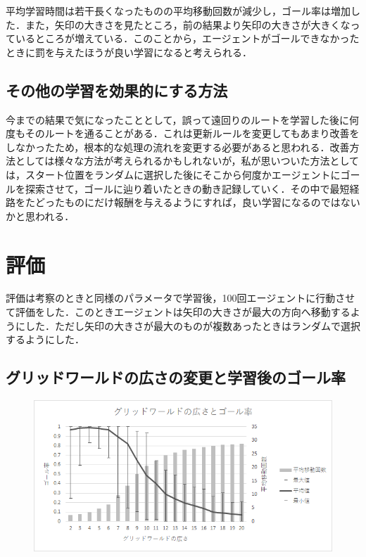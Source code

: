 \documentclass[a4j,11pt]{jarticle}
\begin{document}
平均学習時間は若干長くなったものの平均移動回数が減少し，ゴール率は増加した．また，矢印の大きさを見たところ，前の結果より矢印の大きさが大きくなっているところが増えている．このことから，エージェントがゴールできなかったときに罰を与えたほうが良い学習になると考えられる．

\subsection{その他の学習を効果的にする方法}

今までの結果で気になったこととして，誤って遠回りのルートを学習した後に何度もそのルートを通ることがある．これは更新ルールを変更してもあまり改善をしなかったため，根本的な処理の流れを変更する必要があると思われる．改善方法としては様々な方法が考えられるかもしれないが，私が思いついた方法としては，スタート位置をランダムに選択した後にそこから何度かエージェントにゴールを探索させて，ゴールに辿り着いたときの動き記録していく．その中で最短経路をたどったものにだけ報酬を与えるようにすれば，良い学習になるのではないかと思われる．

\newpage

\section{評価}

評価は考察のときと同様のパラメータで学習後，100回エージェントに行動させて評価をした．このときエージェントは矢印の大きさが最大の方向へ移動するようにした．ただし矢印の大きさが最大のものが複数あったときはランダムで選択するようにした．

\subsection{グリッドワールドの広さの変更と学習後のゴール率}

\begin{figure}[ht]
  \begin{center}
    \includegraphics[scale=1.5]{img/valN.png}
  \end{center}
\end{figure}
\end{document}
